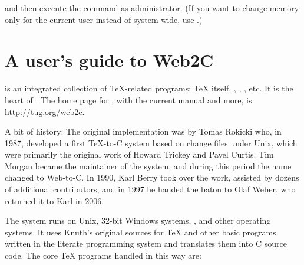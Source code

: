 \documentclass{article}
\begin{document}
\noindent and then execute the command  as
administrator.  (If you want to change memory only for the current user
instead of system-wide, use .)


\section{A user's guide to Web2C}

\Webc{} is an integrated collection of \TeX-related programs: \TeX{}
itself, \MF{}, \MP, \BibTeX{}, etc.  It is the heart of \TL{}.  The home
page for \Webc{}, with the current manual and more, is
\url{http://tug.org/web2c}.

A bit of history: The original implementation was by Tomas Rokicki who,
in 1987, developed a first \TeX{}-to-C system based on change files
under Unix, which were primarily the original work of Howard Trickey and
Pavel Curtis.  Tim Morgan became the maintainer of the system, and
during this period the name changed to Web-to-C\@.  In 1990, Karl Berry
took over the work, assisted by dozens of additional contributors, and
in 1997 he handed the baton to Olaf Weber, who returned it to Karl in
2006.

The \Webc{} system runs on Unix, 32-bit Windows systems, \MacOSX{}, and
other operating systems. It uses Knuth's original sources for \TeX{} and
other basic programs written in the \web{} literate programming system
and translates them into C source code.  The core \TeX{} programs
handled in this way are:
\end{document}
